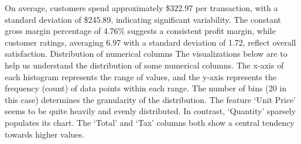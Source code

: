 On average, customers spend approximately \$322.97 per transaction, with a standard deviation of \$245.89, indicating significant variability. The constant gross margin percentage of 4.76\% suggests a consistent profit margin, while customer ratings, averaging 6.97 with a standard deviation of 1.72, reflect overall satisfaction. 
{Distribution of numerical columns}
The visualizations below are to help us understand the distribution of some numerical columns. The x-axis of each histogram represents the range of values, and the y-axis represents the frequency (count) of data points within each range. The number of bins (20 in this case) determines the granularity of the distribution. The feature ‘Unit Price’ seems to be quite heavily and evenly distributed. In contrast, ‘Quantity’ sparsely populates its chart. The ‘Total’ and ‘Tax’ columns both show a central tendency towards higher values.


